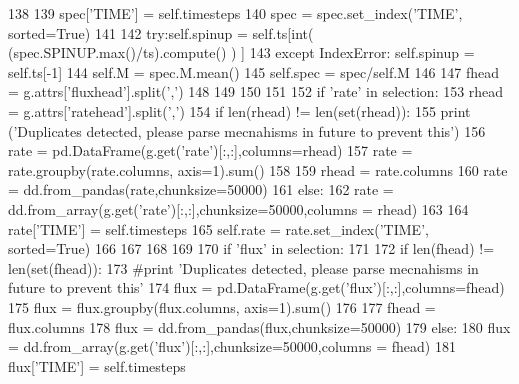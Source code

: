 \begin{DoxyCode}
138 
139                 spec[\textcolor{stringliteral}{'TIME'}] = self.timesteps
140                 spec = spec.set\_index(\textcolor{stringliteral}{'TIME'}, sorted=\textcolor{keyword}{True})
141 
142                 \textcolor{keywordflow}{try}:self.spinup = self.ts[int( (spec.SPINUP.max()/ts).compute() ) ]
143                 \textcolor{keywordflow}{except} IndexError: self.spinup = self.ts[-1]
144                 self.M =  spec.M.mean()
145                 self.spec = spec/self.M
146 
147                 fhead = g.attrs[\textcolor{stringliteral}{'fluxhead'}].split(\textcolor{stringliteral}{','})
148 
149 
150 
151 
152             \textcolor{keywordflow}{if} \textcolor{stringliteral}{'rate'} \textcolor{keywordflow}{in} selection:
153                 rhead = g.attrs[\textcolor{stringliteral}{'ratehead'}].split(\textcolor{stringliteral}{','})
154                 \textcolor{keywordflow}{if} len(rhead) != len(set(rhead)):
155                     \textcolor{keywordflow}{print} (\textcolor{stringliteral}{'Duplicates detected, please parse mecnahisms in future to prevent this'})
156                     rate = pd.DataFrame(g.get(\textcolor{stringliteral}{'rate'})[:,:],columns=rhead)
157                     rate = rate.groupby(rate.columns, axis=1).sum()
158 
159                     rhead = rate.columns
160                     rate = dd.from\_pandas(rate,chunksize=50000)
161                 \textcolor{keywordflow}{else}:
162                     rate = dd.from\_array(g.get(\textcolor{stringliteral}{'rate'})[:,:],chunksize=50000,columns = rhead)
163 
164                 rate[\textcolor{stringliteral}{'TIME'}] = self.timesteps
165                 self.rate = rate.set\_index(\textcolor{stringliteral}{'TIME'}, sorted=\textcolor{keyword}{True})
166 
167 
168 
169 
170             \textcolor{keywordflow}{if} \textcolor{stringliteral}{'flux'} \textcolor{keywordflow}{in} selection:
171 
172                 \textcolor{keywordflow}{if} len(fhead) != len(set(fhead)):
173                     \textcolor{comment}{#print 'Duplicates detected, please parse mecnahisms in future to prevent this'}
174                     flux = pd.DataFrame(g.get(\textcolor{stringliteral}{'flux'})[:,:],columns=fhead)
175                     flux = flux.groupby(flux.columns, axis=1).sum()
176 
177                     fhead = flux.columns
178                     flux = dd.from\_pandas(flux,chunksize=50000)
179                 \textcolor{keywordflow}{else}:
180                     flux = dd.from\_array(g.get(\textcolor{stringliteral}{'flux'})[:,:],chunksize=50000,columns = fhead)
181                 flux[\textcolor{stringliteral}{'TIME'}] = self.timesteps

\end{DoxyCode}
